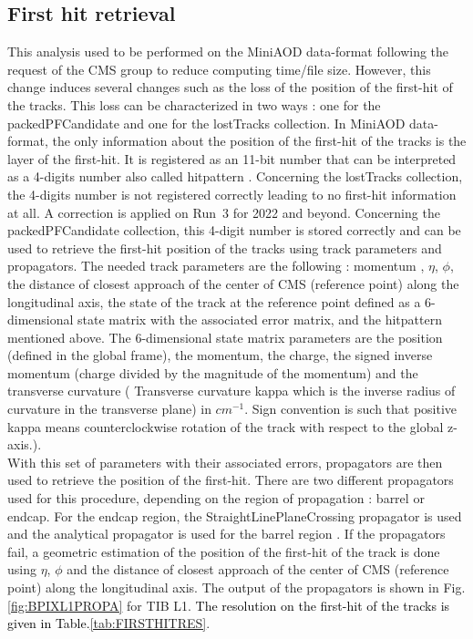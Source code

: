\documentclass{cernatlasnote}
\begin{document}
\begin{appendices}
\section{First hit retrieval}
\label{APP: FIRSTHIT}
This analysis used to be performed on the  MiniAOD data-format following the request of the CMS group to reduce computing time/file size. However, this change induces several changes such as the loss of the position of the first-hit of the tracks. This loss can be characterized in two ways : one for the packedPFCandidate and one for the lostTracks collection. In MiniAOD data-format, the only information about the position of the first-hit of the tracks is the layer of the first-hit. It is registered as an 11-bit number that can be interpreted as a 4-digits number also called hitpattern \cite{HP}. Concerning the lostTracks collection, the 4-digits number is not registered correctly leading to no first-hit information at all. A correction is applied on Run~3 for 2022 and beyond. Concerning the packedPFCandidate collection, this 4-digit number is stored correctly and can be used to retrieve the first-hit position of the tracks using track parameters and propagators. The needed track parameters are the following : momentum , $\eta$, $\phi$, the distance of closest approach of the center of CMS (reference point) along the longitudinal axis, the state of the track at the reference point defined as a 6-dimensional state matrix with the associated error matrix, and the hitpattern mentioned above. The 6-dimensional state matrix parameters are the position (defined in the global frame), the momentum, the charge, the signed inverse momentum (charge divided by the magnitude of the momentum) and the transverse curvature ( Transverse curvature kappa which is the inverse radius of curvature in the transverse plane) in $cm^{-1}$. Sign convention is such that positive kappa means counterclockwise rotation of the track with respect to the global z-axis.). \\

With this set of parameters with their associated errors, propagators are then used to retrieve the position of the first-hit. There are two different propagators used for this procedure, depending on the region of propagation : barrel or endcap. For the endcap region, the StraightLinePlaneCrossing propagator is used and the analytical propagator is used for the barrel region \cite{PROP}. If the propagators fail, a geometric estimation of the position of the first-hit of the track is done using $\eta$, $\phi$ and the distance of closest approach of the center of CMS (reference point) along the longitudinal axis. The output of the propagators is shown in Fig.\ref{fig:BPIXL1PROPA} for TIB L1. \textcolor{black}{The resolution on the first-hit of the tracks is given in Table.\ref{tab:FIRSTHITRES}}.


\end{appendices}
\end{document}
